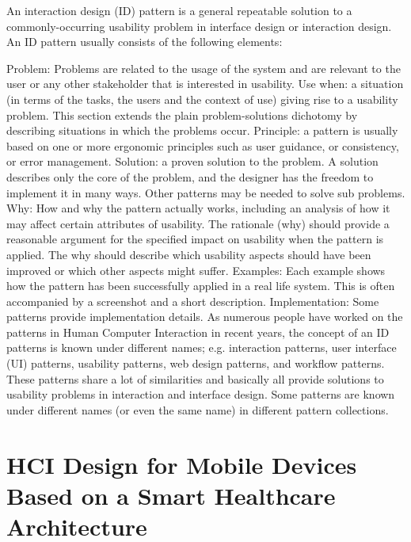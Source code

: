 \documentclass[letterpaper,12pt]{article}
\begin{document}
An interaction design (ID) pattern is a general repeatable solution to a commonly-occurring usability problem in interface design or interaction design. An ID pattern usually consists of the following elements:

Problem: Problems are related to the usage of the system and are relevant to the user or any other stakeholder that is interested in usability.
Use when: a situation (in terms of the tasks, the users and the context of use) giving rise to a usability problem. This section extends the plain problem-solutions dichotomy by describing situations in which the problems occur.
Principle: a pattern is usually based on one or more ergonomic principles such as user guidance, or consistency, or error management.
Solution: a proven solution to the problem. A solution describes only the core of the problem, and the designer has the freedom to implement it in many ways. Other patterns may be needed to solve sub problems.
Why: How and why the pattern actually works, including an analysis of how it may affect certain attributes of usability. The rationale (why) should provide a reasonable argument for the specified impact on usability when the pattern is applied. The why should describe which usability aspects should have been improved or which other aspects might suffer.
Examples: Each example shows how the pattern has been successfully applied in a real life system. This is often accompanied by a screenshot and a short description.
Implementation: Some patterns provide implementation details.
As numerous people have worked on the patterns in Human Computer Interaction in recent years, the concept of an ID patterns is known under different names; e.g. interaction patterns, user interface (UI) patterns, usability patterns, web design patterns, and workflow patterns. These patterns share a lot of similarities and basically all provide solutions to usability problems in interaction and interface design. Some patterns are known under different names (or even the same name) in different pattern collections.

\section{HCI Design for Mobile Devices Based on a
Smart Healthcare Architecture}
\end{document}
